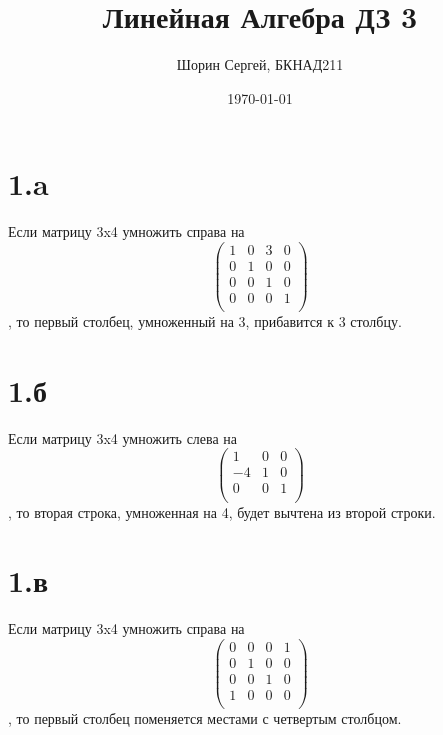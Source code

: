\documentclass[a4paper]{article}
\author{Шорин Сергей, БКНАД211}
\title{Линейная Алгебра ДЗ 3}
\date{\today}
\begin{document}
\maketitle

\newpage

\section*{1.a}

Если матрицу 3x4 умножить справа на
\begin{equation*}
\begin{pmatrix}
1 & 0 & 3 & 0\\
0 & 1 & 0 & 0\\
0 & 0 & 1 & 0\\
0 & 0 & 0 & 1\\
\end{pmatrix}
\end{equation*}, то первый столбец, умноженный на 3, прибавится к 3 столбцу.



\section*{1.б}
Если матрицу 3x4 умножить слева на
\begin{equation*}
\begin{pmatrix}
1 & 0 & 0\\
-4 & 1 & 0\\
0 & 0 & 1\\
\end{pmatrix}
\end{equation*}, то вторая строка, умноженная на 4, будет вычтена из второй строки.



\section*{1.в}

Если матрицу 3x4 умножить справа на
\begin{equation*}
\begin{pmatrix}
0 & 0 & 0 & 1\\
0 & 1 & 0 & 0\\
0 & 0 & 1 & 0\\
1 & 0 & 0 & 0\\
\end{pmatrix}
\end{equation*}, то первый столбец поменяется местами с четвертым столбцом.
\end{document}
